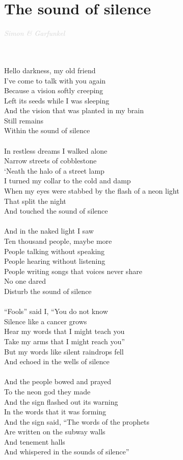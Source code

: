 \documentclass[a5paper, 10pt]{book}
\begin{document}
\section{The sound of silence}\textcolor{lightgray}{\textit{Simon \& Garfunkel}}\\~\\
\begin{minipage}[t]{0.7\textwidth}
  ~\\
  Hello darkness, my old friend\\
  I've come to talk with you again\\
  Because a vision softly creeping\\
  Left its seeds while I was sleeping\\
  And the vision that was planted in my brain\\
  Still remains\\
  Within the sound of silence\\
  \\
  In restless dreams I walked alone\\
  Narrow streets of cobblestone\\
  `Neath the halo of a street lamp\\
  I turned my collar to the cold and damp\\
  When my eyes were stabbed by the flash of a neon light\\
  That split the night\\
  And touched the sound of silence\\
  \\
  And in the naked light I saw\\
  Ten thousand people, maybe more\\
  People talking without speaking\\
  People hearing without listening\\
  People writing songs that voices never share\\
  No one dared\\
  Disturb the sound of silence\\
  \\
  ``Fools'' said I, ``You do not know\\
  Silence like a cancer grows\\
  Hear my words that I might teach you\\
  Take my arms that I might reach you''\\
  But my words like silent raindrops fell\\
  And echoed in the wells of silence\\
  \\
  And the people bowed and prayed\\
  To the neon god they made\\
  And the sign flashed out its warning\\
  In the words that it was forming\\
  And the sign said, ``The words of the prophets\\
  Are written on the subway walls\\
  And tenement halls\\
  And whispered in the sounds of silence''\\
\end{minipage}
\end{document}
